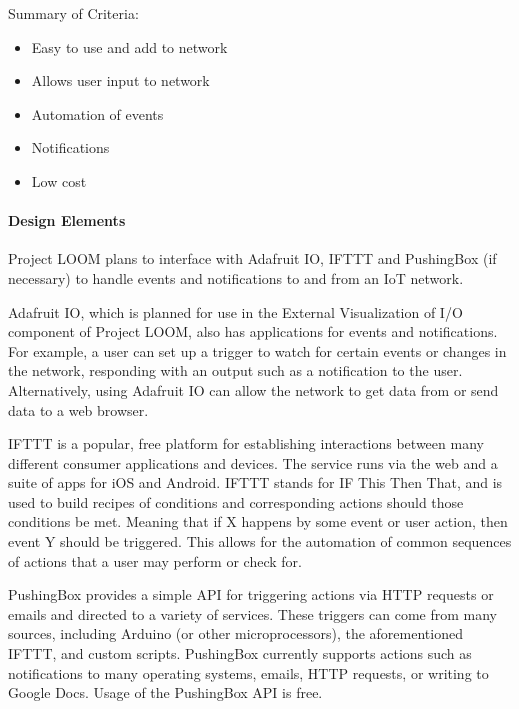 \documentclass[onecolumn, draftclsnofoot,10pt, compsoc]{IEEEtran}
\begin{document}
Summary of Criteria:
\begin{itemize}[noitemsep,topsep=-10pt]
    \item Easy to use and add to network
    \item Allows user input to network
    \item Automation of events
    \item Notifications
    \item Low cost
\end{itemize}

\paragraph{Design Elements}
Project LOOM plans to interface with Adafruit IO, IFTTT and PushingBox (if necessary) to handle events and notifications to and from an IoT network.

Adafruit IO, which is planned for use in the External Visualization of I/O component of Project LOOM, also has applications for events and notifications. For example, a user can set up a trigger to watch for certain events or changes in the network, responding with an output such as a notification to the user. Alternatively, using Adafruit IO can allow the network to get data from or send data to a web browser. \cite{adafruitio}

IFTTT is a popular, free platform for establishing interactions between many different consumer applications and devices. The service runs via the web and a suite of apps for iOS and Android. IFTTT stands for IF This Then That, and is used to build recipes of conditions and corresponding actions should those conditions be met. Meaning that if X happens by some event or user action, then event Y should be triggered. This allows for the automation of common sequences of actions that a user may perform or check for. \cite{ifttt}

PushingBox provides a simple API for triggering actions via HTTP requests or emails and directed to a variety of services. These triggers can come from many sources, including Arduino (or other microprocessors), the aforementioned IFTTT, and custom scripts. PushingBox currently supports actions such as notifications to many operating systems, emails, HTTP requests, or writing to Google Docs. Usage of the PushingBox API is free. \cite{pushingbox}
\end{document}
